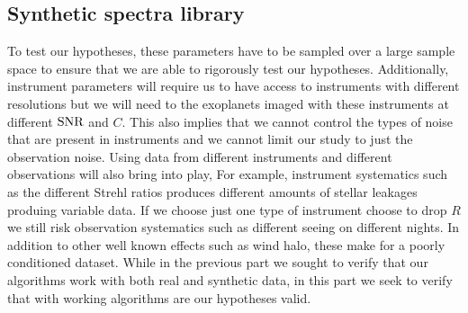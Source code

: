 \subsection{Synthetic spectra library}
To test our hypotheses, these parameters have to be sampled over a large sample space to ensure that we are able to rigorously test our hypotheses.
Additionally, instrument parameters will require us to have access to instruments with different resolutions but we will need to the exoplanets imaged with these instruments at different $\rm{SNR}$ and $C$.
This also implies that we cannot control the types of noise that are present in instruments and we cannot limit our study to just the observation noise.
Using data from different instruments and different observations will also bring into play,
For example, instrument systematics such as the different Strehl ratios produces different amounts of stellar leakages produing variable data.
If we choose just one type of instrument choose to drop $R$ we still risk observation systematics such as different seeing on different nights. 
In addition to other well known effects such as wind halo, these make for a poorly conditioned dataset. 
While in the previous part we sought to verify that our algorithms work with both real and synthetic data, in this part we seek to verify that with working algorithms are our hypotheses valid.

